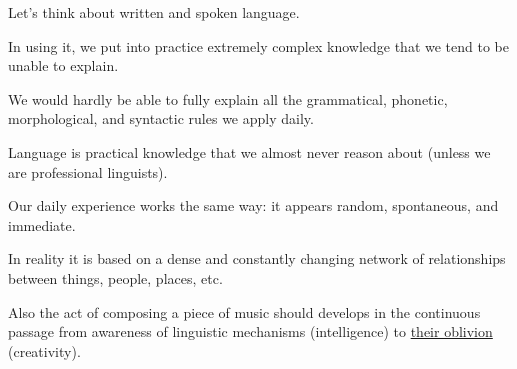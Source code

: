 Let's think about written and spoken language.

In using it, we put into practice extremely complex knowledge that we tend to be unable to explain.

We would hardly be able to fully explain all the grammatical, phonetic, morphological, and syntactic rules we apply daily.

Language is practical knowledge that we almost never reason about (unless we are professional linguists).

Our daily experience works the same way: it appears random, spontaneous, and immediate.

In reality it is based on a dense and constantly changing network of relationships between things, people, places, etc.

Also the act of composing a piece of music should develops in the continuous passage from awareness of linguistic mechanisms (intelligence) to \href{senso1.mp4}{their oblivion} (creativity).